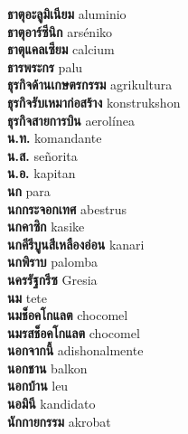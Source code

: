 \textbf{ ธาตุอะลูมิเนียม  } aluminio \\
\textbf{ ธาตุอาร์ซีนิก  } arséniko \\
\textbf{ ธาตุแคลเซียม  } calcium \\
\textbf{ ธารพระกร  } palu \\
\textbf{ ธุรกิจด้านเกษตรกรรม  } agrikultura \\
\textbf{ ธุรกิจรับเหมาก่อสร้าง  } konstrukshon \\
\textbf{ ธุรกิจสายการบิน  } aerolínea \\
\textbf{ น.ท.  } komandante \\
\textbf{ น.ส.  } señorita \\
\textbf{ น.อ.  } kapitan \\
\textbf{ นก  } para \\
\textbf{ นกกระจอกเทศ  } abestrus \\
\textbf{ นกคาซิก  } kasike \\
\textbf{ นกคีรีบูนสีเหลืองอ่อน  } kanari \\
\textbf{ นกพิราบ  } palomba \\
\textbf{ นครรัฐกรีซ  } Gresia \\
\textbf{ นม  } tete \\
\textbf{ นมช็อคโกแลต  } chocomel \\
\textbf{ นมรสช็อคโกแลต  } chocomel \\
\textbf{ นอกจากนี้  } adishonalmente \\
\textbf{ นอกชาน  } balkon \\
\textbf{ นอกบ้าน  } leu \\
\textbf{ นอมินี  } kandidato \\
\textbf{ นักกายกรรม  } akrobat \\
